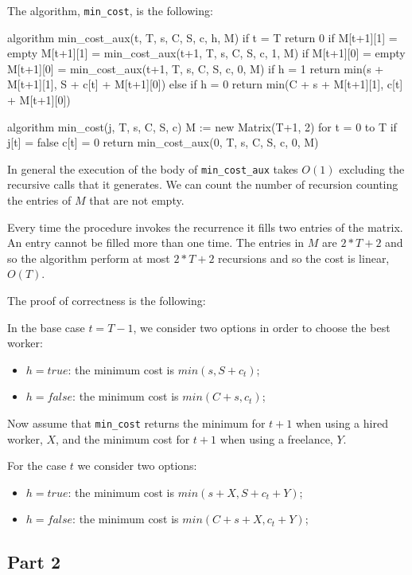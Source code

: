 \documentclass[paper=a4, fontsize=11pt]{scrartcl} %
\numberwithin{equation}{section} %
\numberwithin{figure}{section} %
\numberwithin{table}{section} %
\begin{document}
The algorithm, \verb|min_cost|, is the following:

\begin{pseudo}
algorithm min_cost_aux(t, T, s, C, S, c, h, M)
    if t = T
        return 0
    if M[t+1][1] = empty
         M[t+1][1] = min_cost_aux(t+1, T, s, C, S, c, 1, M)
    if M[t+1][0] = empty
         M[t+1][0] = min_cost_aux(t+1, T, s, C, S, c, 0, M)
    if h = 1
        return min(s + M[t+1][1], S + c[t] + M[t+1][0])
    else if h = 0
        return min(C + s + M[t+1][1], c[t] + M[t+1][0])
\end{pseudo}
\begin{pseudo}
algorithm min_cost(j, T, s, C, S, c)
    M := new Matrix(T+1, 2) 
    for t = 0 to T
        if j[t] = false
            c[t] = 0
    return min_cost_aux(0, T, s, C, S, c, 0, M)
\end{pseudo}

In general the execution of the body of \verb|min_cost_aux| takes $O(1)$ excluding the recursive calls that it generates. We can count the number of recursion counting the entries of $M$ that are not empty.

Every time the procedure invokes the recurrence it fills two entries of the matrix. An entry cannot be filled more than one time. The entries in $M$ are $2*T+2$ and so the algorithm perform at most $2*T+2$ recursions and so the cost is linear, $O(T)$.

The proof of correctness is the following:

In the base case $t = T-1$, we consider two options in order to choose the best worker:
\begin{itemize}
    \item $h = true$: the minimum cost is $min(s, S + c_t)$;
    \item $h = false$: the minimum cost is $min(C + s, c_t)$;
\end{itemize}

Now assume that \verb|min_cost| returns the minimum for $t+1$ when using a hired worker, $X$, and the minimum cost for $t+1$ when using a freelance, $Y$.

For the case $t$ we consider two options:
\begin{itemize}
    \item $h = true$: the minimum cost is $min(s + X, S + c_t + Y)$;
    \item $h = false$: the minimum cost is $min(C + s + X, c_t + Y)$;
\end{itemize}

\subsection*{Part 2}
\end{document}
